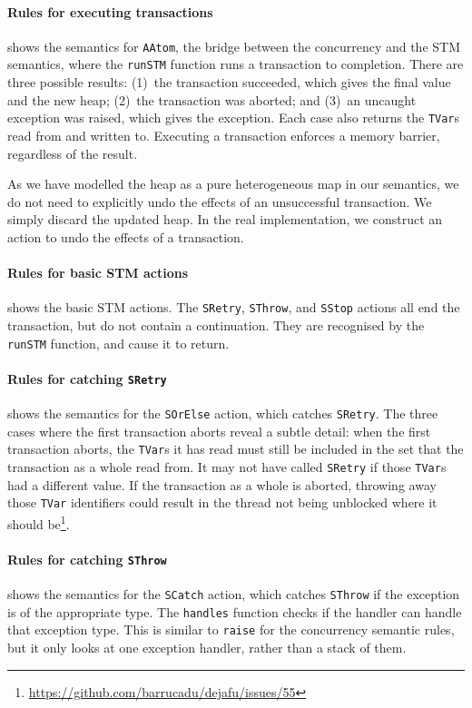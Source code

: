 \paragraph{Rules for executing transactions}
 shows the semantics for \verb|AAtom|, the bridge
between the concurrency and the STM semantics, where the \verb|runSTM|
function runs a transaction to completion.  There are three possible
results: (1)~the transaction succeeded, which gives the final value
and the new heap; (2)~the transaction was aborted; and (3)~an uncaught
exception was raised, which gives the exception.  Each case also
returns the \verb|TVar|s read from and written to.  Executing a
transaction enforces a memory barrier, regardless of the result.

As we have modelled the heap as a pure heterogeneous map in our
semantics, we do not need to explicitly undo the effects of an
unsuccessful transaction.  We simply discard the updated heap.  In the
real implementation, we construct an action to undo the effects of a
transaction.

\paragraph{Rules for basic STM actions}
 shows the basic STM actions.  The \verb|SRetry|,
\verb|SThrow|, and \verb|SStop| actions all end the transaction, but
do not contain a continuation.  They are recognised by the
\verb|runSTM| function, and cause it to return.

\paragraph{Rules for catching \texttt{SRetry}}
 shows the semantics for the \verb|SOrElse| action,
which catches \verb|SRetry|.  The three cases where the first
transaction aborts reveal a subtle detail: when the first transaction
aborts, the \verb|TVar|s it has read must still be included in the set
that the transaction as a whole read from.  It may not have called
\verb|SRetry| if those \verb|TVar|s had a different value.  If the
transaction as a whole is aborted, throwing away those \verb|TVar|
identifiers could result in the thread not being unblocked where it
should
be\footnote{\url{https://github.com/barrucadu/dejafu/issues/55}}.

\paragraph{Rules for catching \texttt{SThrow}}
 shows the semantics for the \verb|SCatch| action,
which catches \verb|SThrow| if the exception is of the appropriate
type.  The \verb|handles| function checks if the handler can handle
that exception type.  This is similar to \verb|raise| for the
concurrency semantic rules, but it only looks at one exception
handler, rather than a stack of them.

